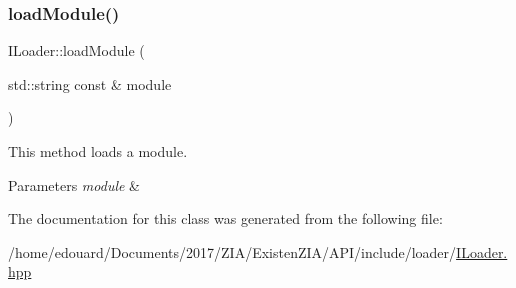 \subsubsection{\texorpdfstring{load\+Module()}{loadModule()}}
{\footnotesize\ttfamily I\+Loader\+::load\+Module (\begin{DoxyParamCaption}\item[{std\+::string const \&}]{module }\end{DoxyParamCaption})\hspace{0.3cm}{\ttfamily [pure virtual]}}



This method loads a module. 


\begin{DoxyParams}{Parameters}
{\em module} & \\
\hline
\end{DoxyParams}


The documentation for this class was generated from the following file\+:\begin{DoxyCompactItemize}
\item 
/home/edouard/\+Documents/2017/\+Z\+I\+A/\+Existen\+Z\+I\+A/\+A\+P\+I/include/loader/\mbox{\hyperlink{ILoader_8hpp}{I\+Loader.\+hpp}}\end{DoxyCompactItemize}
